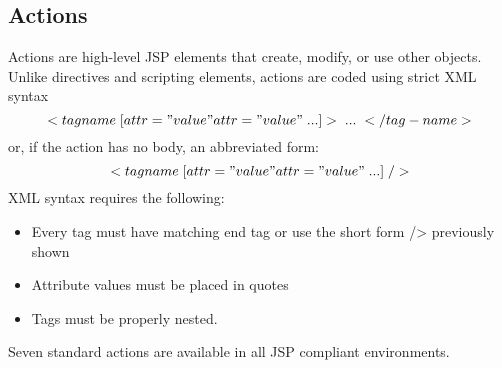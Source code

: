 \subsection{Actions}
Actions are high-level JSP elements that create, modify, or use other objects. Unlike directives and scripting elements, actions are coded using strict XML syntax
$$<tagname\;[attr="value" attr="value"\; ...] >\; ...\; </tag-name>$$ or, if the action has no body, an abbreviated form:
$$<tagname\; [attr="value" attr="value"\; ...]\; />$$ XML syntax requires the following:
\begin{itemize}
	\item Every tag must have matching end tag or use the short form /> previously shown
	\item Attribute values must be placed in quotes
	\item Tags must be properly nested.
\end{itemize}
Seven standard actions are available in all JSP compliant environments.